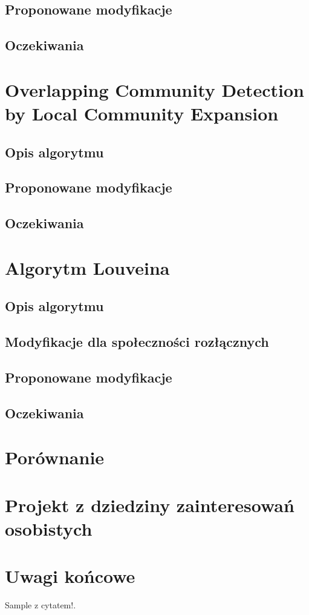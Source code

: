 \documentclass{article}
\begin{document}
\subsection{Proponowane modyfikacje}
\subsection{Oczekiwania}

\newpage
\section{Overlapping Community Detection by Local Community Expansion}
\subsection{Opis algorytmu}
\subsection{Proponowane modyfikacje}
\subsection{Oczekiwania}

\newpage
\section{Algorytm Louveina}
\subsection{Opis algorytmu}
\subsection{Modyfikacje dla społeczności rozłącznych}
\subsection{Proponowane modyfikacje}
\subsection{Oczekiwania}

\newpage
\section{Porównanie}

\newpage
\section{Projekt z dziedziny zainteresowań osobistych}

\newpage
\section{Uwagi końcowe}
Sample z cytatem!\cite{sample}.

\printbibliography
\end{document}
